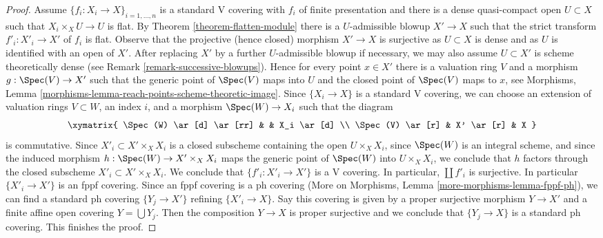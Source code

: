 \begin{proof}
\medskip\noindent
Assume $\{f_i : X_i \to X\}_{i = 1, \ldots, n}$ is a standard V covering
with $f_i$ of finite presentation and there is a dense quasi-compact open
$U \subset X$ such that $X_i \times_X U \to U$ is flat.
By Theorem \ref{theorem-flatten-module}
there is a $U$-admissible blowup $X' \to X$ such that
the strict transform $f'_i : X'_i \to X'$ of $f_i$ is flat.
Observe that the projective (hence closed) morphism $X' \to X$
is surjective as $U \subset X$ is dense and as $U$ is identified
with an open of $X'$. After replacing $X'$ by a further
$U$-admissible blowup if necessary,
we may also assume $U \subset X'$ is scheme theoretically dense
(see Remark \ref{remark-successive-blowups}).
Hence for every point $x \in X'$ there is a valuation ring $V$
and a morphism $g : \Spec(V) \to X'$ such that the generic
point of $\Spec(V)$ maps into $U$ and the closed point of
$\Spec(V)$ maps to $x$, see Morphisms, Lemma
\ref{morphisms-lemma-reach-points-scheme-theoretic-image}.
Since $\{X_i \to X\}$ is a standard V covering, we can choose
an extension of valuation rings $V \subset W$, an index $i$, and a morphism
$\Spec(W) \to X_i$ such that the diagram
$$
\xymatrix{
\Spec(W) \ar[d] \ar[rr] & & X_i \ar[d] \\
\Spec(V) \ar[r] & X' \ar[r] & X
}
$$
is commutative. Since $X'_i \subset X' \times_X X_i$ is a closed subscheme
containing the open $U \times_X X_i$, since $\Spec(W)$ is an integral scheme,
and since the induced morphism $h : \Spec(W) \to X' \times_X X_i$ maps
the generic point of $\Spec(W)$ into $U \times_X X_i$, we conclude
that $h$ factors through the closed subscheme $X'_i \subset X' \times_X X_i$.
We conclude that $\{f'_i : X'_i \to X'\}$ is a V covering.
In particular, $\coprod f'_i$ is surjective. In particular
$\{X'_i \to X'\}$ is an fppf covering. Since an fppf covering is a ph covering
(More on Morphisms, Lemma \ref{more-morphisms-lemma-fppf-ph}),
we can find a standard ph covering $\{Y_j \to X'\}$ refining
$\{X'_i \to X\}$. Say this covering is given by a proper surjective
morphism $Y \to X'$ and a finite affine open covering
$Y = \bigcup Y_j$. Then the composition $Y \to X$ is proper surjective
and we conclude that $\{Y_j \to X\}$ is a standard ph covering.
This finishes the proof.
\end{proof}